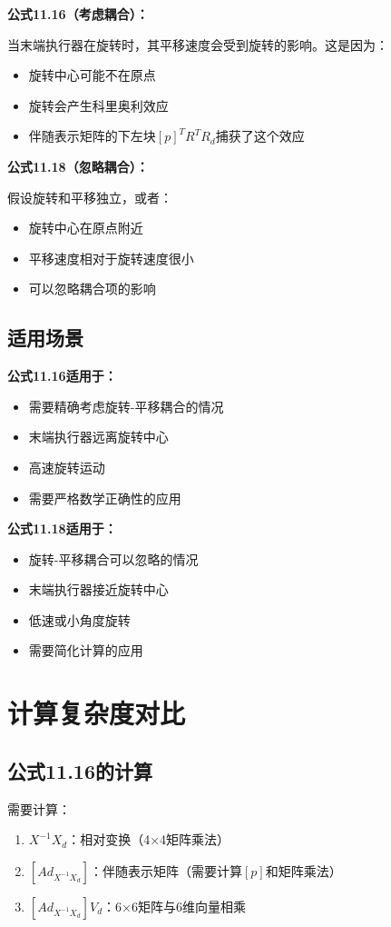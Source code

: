 \documentclass[12pt,a4paper]{article}
\begin{document}
\textbf{公式11.16（考虑耦合）：}

当末端执行器在旋转时，其平移速度会受到旋转的影响。这是因为：
\begin{itemize}
\item 旋转中心可能不在原点
\item 旋转会产生科里奥利效应
\item 伴随表示矩阵的下左块$[p]^T R^T R_d$捕获了这个效应
\end{itemize}

\textbf{公式11.18（忽略耦合）：}

假设旋转和平移独立，或者：
\begin{itemize}
\item 旋转中心在原点附近
\item 平移速度相对于旋转速度很小
\item 可以忽略耦合项的影响
\end{itemize}

\subsection{适用场景}

\textbf{公式11.16适用于：}
\begin{itemize}
\item 需要精确考虑旋转-平移耦合的情况
\item 末端执行器远离旋转中心
\item 高速旋转运动
\item 需要严格数学正确性的应用
\end{itemize}

\textbf{公式11.18适用于：}
\begin{itemize}
\item 旋转-平移耦合可以忽略的情况
\item 末端执行器接近旋转中心
\item 低速或小角度旋转
\item 需要简化计算的应用
\end{itemize}

\section{计算复杂度对比}

\subsection{公式11.16的计算}

需要计算：
\begin{enumerate}
\item $X^{-1} X_d$：相对变换（4×4矩阵乘法）
\item $[Ad_{X^{-1}X_d}]$：伴随表示矩阵（需要计算$[p]$和矩阵乘法）
\item $[Ad_{X^{-1}X_d}] V_d$：6×6矩阵与6维向量相乘
\end{enumerate}
\end{document}
